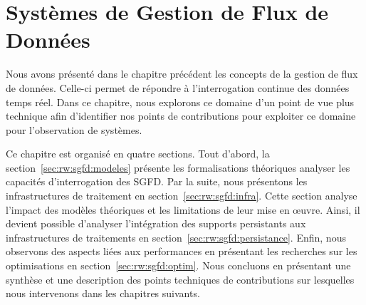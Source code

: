 
\chapter{Systèmes de Gestion de Flux de Données}\label{chap:rw:sgfd}
\chaptertoc
Nous avons présenté dans le chapitre précédent les concepts de la gestion de flux de données. Celle-ci permet de répondre à l'interrogation continue des données temps réel. Dans ce chapitre, nous explorons ce domaine d'un point de vue plus technique afin d'identifier nos points de contributions pour exploiter ce domaine pour l'observation de systèmes.

Ce chapitre est organisé en quatre sections. Tout d'abord, la section~\ref{sec:rw:sgfd:modeles} présente les formalisations théoriques analyser les capacités d'interrogation des SGFD. Par la suite, nous présentons les infrastructures de traitement en section~\ref{sec:rw:sgfd:infra}. Cette section analyse l'impact des modèles théoriques et les limitations de leur mise en œuvre. Ainsi, il devient possible d'analyser l'intégration des supports persistants aux infrastructures de traitements en section~\ref{sec:rw:sgfd:persistance}. Enfin, nous observons des aspects liées aux performances en présentant les recherches sur les optimisations en section~\ref{sec:rw:sgfd:optim}. Nous concluons en présentant une synthèse et une description des points techniques de contributions sur lesquelles nous intervenons dans les chapitres suivants.






